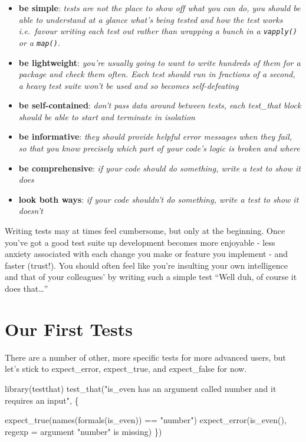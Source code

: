\documentclass[
  letterpaper,
  DIV=11,
  numbers=noendperiod]{scrreprt}
\newenvironment{Shaded}{\begin{snugshade}}{\end{snugshade}}
\newcommand{\AttributeTok}[1]{\textcolor[rgb]{0.40,0.45,0.13}{#1}}
\newcommand{\FunctionTok}[1]{\textcolor[rgb]{0.28,0.35,0.67}{#1}}
\newcommand{\NormalTok}[1]{\textcolor[rgb]{0.00,0.23,0.31}{#1}}
\newcommand{\SpecialCharTok}[1]{\textcolor[rgb]{0.37,0.37,0.37}{#1}}
\newcommand{\StringTok}[1]{\textcolor[rgb]{0.13,0.47,0.30}{#1}}
\providecommand{\tightlist}{%
  \setlength{\itemsep}{0pt}\setlength{\parskip}{0pt}}\usepackage{longtable,booktabs,array}
\begin{document}
\begin{itemize}
\tightlist
\item
  \textbf{be simple}: \emph{tests are not the place to show off what you
  can do, you should be able to understand at a glance what's being
  tested and how the test works i.e.~favour writing each test out rather
  than wrapping a bunch in a \texttt{vapply()} or a \texttt{map()}.}
\item
  \textbf{be lightweight}: \emph{you're usually going to want to write
  hundreds of them for a package and check them often. Each test should
  run in fractions of a second, a heavy test suite won't be used and so
  becomes self-defeating}
\item
  \textbf{be self-contained}: \emph{don't pass data around between
  tests, each test\_that block should be able to start and terminate in
  isolation}
\item
  \textbf{be informative}: \emph{they should provide helpful error
  messages when they fail, so that you know precisely which part of your
  code's logic is broken and where}
\item
  \textbf{be comprehensive}: \emph{if your code should do something,
  write a test to show it does}
\item
  \textbf{look both ways}: \emph{if your code shouldn't do something,
  write a test to show it doesn't}
\end{itemize}

Writing tests may at times feel cumbersome, but only at the beginning.
Once you've got a good test suite up development becomes more enjoyable
- less anxiety associated with each change you make or feature you
implement - and faster (trust!). You should often feel like you're
insulting your own intelligence and that of your colleagues' by writing
such a simple test ``Well duh, of course it does that\ldots{}''

\section{Our First Tests}\label{our-first-tests}

There are a number of other, more specific tests for more advanced
users, but let's stick to expect\_error, expect\_true, and expect\_false
for now.

\begin{Shaded}
\begin{Highlighting}[]
\FunctionTok{library}\NormalTok{(testthat)}
\FunctionTok{test\_that}\NormalTok{(}\StringTok{"is\_even has an argument called number and it requires an input"}\NormalTok{, \{}
  
  \FunctionTok{expect\_true}\NormalTok{(}\FunctionTok{names}\NormalTok{(}\FunctionTok{formals}\NormalTok{(is\_even)) }\SpecialCharTok{==} \StringTok{"number"}\NormalTok{)}
  \FunctionTok{expect\_error}\NormalTok{(}\FunctionTok{is\_even}\NormalTok{(),}
               \AttributeTok{regexp =} \StringTok{\textquotesingle{}argument "number" is missing\textquotesingle{}}\NormalTok{)}
\NormalTok{\})}
\end{Highlighting}
\end{Shaded}
\end{document}
